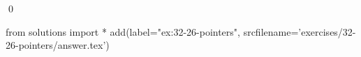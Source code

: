 
\begin{ex}
  \label{ex:32-26-pointers}
  
  \qed
\end{ex}
\begin{python0}
from solutions import *
add(label="ex:32-26-pointers",
    srcfilename='exercises/32-26-pointers/answer.tex')
\end{python0}

